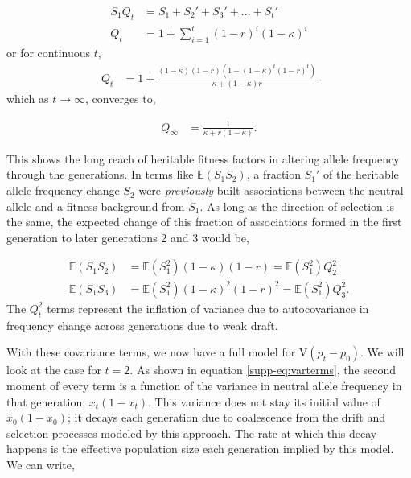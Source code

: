 \documentclass[11pt]{article}
\newcommand{\E}{\mathbb{E}}
\newcommand{\V}{\text{V}}
\newcommand{\V}{\text{V}}
\begin{document}
\begin{align}
  \label{eq:qterm}
  S_1 Q_t &= S_1 + S_2' + S_3' + \ldots + S_t' \nonumber \\
  Q_t &= 1 + \sum_{i=1}^t (1-r)^i(1-\kappa)^i
\end{align}
%
or for continuous $t$, 
%
\begin{align}
  \label{eq:q_t}
  Q_t &= 1+\frac{(1-\kappa) (1-r) \left(1-(1-\kappa)^t (1-r)^t\right)}{\kappa+(1-\kappa)r}
\end{align}
which as $t \to \infty$, converges to,

\begin{align}
  \label{eq:Qinf}
  Q_\infty &= \frac{1}{\kappa + r(1-\kappa)}.
\end{align}

This shows the long reach of heritable fitness factors in altering allele
frequency through the generations. In terms like $\E(S_1 S_2)$, a fraction
$S_1'$ of the heritable allele frequency change $S_2$ were \emph{previously}
built associations between the neutral allele and a fitness background from
$S_1$. As long as the direction of selection is the same, the expected change
of this fraction of associations formed in the first generation to later
generations 2 and 3 would be,

\begin{align}
  \E(S_1 S_2) &= \E(S_1^2) (1-\kappa)(1-r) = \E(S_1^2) Q_2^2 \nonumber \\
  \E(S_1 S_3) &= \E(S_1^2) (1-\kappa)^2(1-r)^2 = \E(S_1^2) Q_3^2.
\end{align}
%
The $Q_t^2$ terms represent the inflation of variance due to autocovariance in
frequency change across generations due to weak draft.

With these covariance terms, we now have a full model for $\V(p_t - p_0)$. We
will look at the case for $t=2$. As shown in equation \eqref{supp-eq:varterms},
the second moment of every term is a function of the variance in neutral allele
frequency in that generation, $x_t(1-x_t)$. This variance does not stay its
initial value of $x_0(1-x_0)$; it decays each generation due to coalescence
from the drift and selection processes modeled by this approach. The rate at
which this decay happens is the effective population size each generation
implied by this model. We can write,
\end{document}
